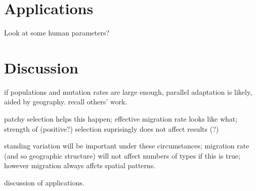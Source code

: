 \documentclass{article}
\begin{document}
\section{Applications} 
 
Look at some human parameters? 
 
\section{Discussion} 
 
if populations and mutation rates are large enough, parallel adaptation is likely, aided by geography. 
recall others' work. 
 
patchy selection helps this happen; 
effective migration rate looks like what; 
strength of (positive?) selection suprisingly does not affect results (?) 
 
standing variation will be important under these circumstances; 
migration rate (and so geographic structure) will not affect numbers of types if this is true; 
however migration always affcts spatial patterns. 
 
discussion of applications. 
 
\end{document}
